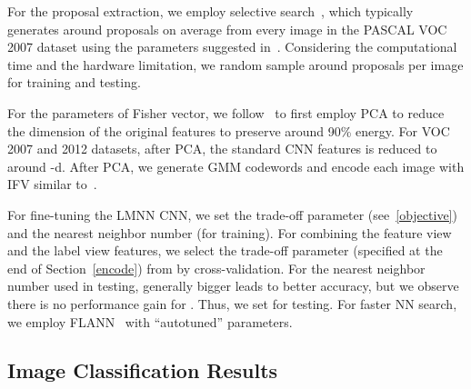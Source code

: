\documentclass[10pt,twocolumn,letterpaper]{article}
\begin{document}
For the proposal extraction, we employ selective
search~\cite{Uijlings2013}, which typically generates around
 proposals on average from every image in the PASCAL VOC
2007 dataset using the parameters suggested
in~\cite{Uijlings2013}. Considering the computational time and the
hardware limitation, we random sample around  proposals per image for training and testing. 

For the parameters of Fisher vector, we
follow~\cite{Perronnin2010} to first employ PCA to reduce the
dimension of the original features to preserve around 90\% energy.
For VOC 2007 and 2012 datasets, after PCA, the standard CNN
features is reduced to around -d. After PCA, we generate 
GMM codewords and encode each image with IFV similar to~\cite{Perronnin2010}.

For fine-tuning the LMNN CNN, we set the trade-off parameter
 (see~\eqref{objective}) and the nearest neighbor number
 (for training). For combining the feature view and
the label view features, we select the trade-off parameter
 (specified at the end of Section~\ref{encode}) from
 by cross-validation. For the nearest neighbor
number  used in testing, generally bigger  leads to better
accuracy, but we observe there is no performance gain for . Thus, we set  for testing. For faster NN search, we
employ FLANN~\cite{flann} with ``autotuned'' parameters.

\subsection{Image Classification Results} \label{results}
\end{document}
